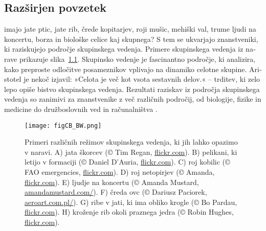 









\begin{slovenian}
\chapter{Razširjen povzetek}
\label{chap:a}

 imajo jate ptic, jate rib, črede kopitarjev, roji mušic, mehiški val, trume ljudi na koncertu, borza in biološke celice kaj skupnega? S tem se ukvarjajo znanstveniki, ki raziskujejo področje skupinskega vedenja. Primere skupinskega vedenja iz narave prikazuje slika~\ref{fig:CB_si}. Skupinsko vedenje je fascinantno področje, ki analizira, kako preproste odločitve posameznikov vplivajo na dinamiko celotne skupine. Aristotel je nekoč izjavil: »Celota je več kot vsota sestavnih delov.« -- trditev, ki zelo lepo opiše bistvo skupinskega vedenja. Rezultati raziskav iz področja skupinskega vedenja so zanimivi za znanstvenike z več različnih področij, od biologije, fizike in medicine do družboslovnih ved in računalništva \cite{deisboeck2009collective,lebarbajec2009organized,nahin2012chases,silverberg2013collective,spector2003emergence,sumpter2006principles,vicsek1995novel,wei2009pursuit,xu2014crowd}.

\begin{figure}[p]
	\texttt{[image: figCB\_BW.png]}
	\caption{Primeri različnih režimov skupinskega vedenja, ki jih lahko opazimo v naravi. A) jata škorcev (© Tim Regan, \href{www.flickr.com}{flickr.com}). B) pelikani, ki letijo v formaciji (© Daniel D'Auria, \href{www.flickr.com}{flickr.com}). C) roj kobilic (© FAO emergencies, \href{www.flickr.com}{flickr.com}). D) roj netopirjev (© Amanda, \href{www.flickr.com}{flickr.com}). E) ljudje na koncertu (© Amanda Mustard, \href{http://www.amandamustard.com/}{amandamustard.com/}). F) čreda ovc (© Dariusz Paciorek, \href{http://www.aeroart.com.pl/}{aeroart.com.pl/}). G) ribe v jati, ki ima obliko krogle (© Bo Pardau, \href{www.flickr.com}{flickr.com}). H) kroženje rib okoli praznega jedra (© Robin Hughes, \href{www.flickr.com}{flickr.com}).}
	\label{fig:CB_si}
\end{figure}


\end{slovenian}
